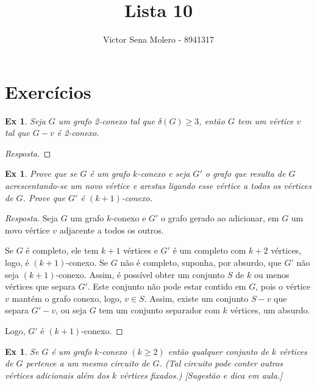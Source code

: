 \documentclass[12pt]{article}
\newcounter{exCounter}
\newtheorem{ex}[exCounter]{Ex}
\begin{document}
 
 
\title{Lista 10}
\author{Victor Sena Molero - 8941317}
\maketitle

\section{Exercícios}
\begin{ex}
Seja $G$ um grafo 2-conexo tal que $\delta(G) \geq 3$, então $G$ tem um vértice $v$ tal que $G-v$ é 2-conexo.
\end{ex}

\begin{proof}[Resposta]
\end{proof}

\begin{ex}
Prove que se $G$ é um grafo $k$-conexo e seja $G'$ o grafo que resulta de $G$ acrescentando-se um novo vértice e arestas ligando esse vértice a todos os vértices de $G$. Prove que $G'$ é $(k+1)$-conexo.
\end{ex}

\begin{proof}[Resposta]
Seja $G$ um grafo $k$-conexo e $G'$ o grafo gerado ao adicionar, em $G$ um novo vértice $v$ adjacente a todos os outros.

Se $G$ é completo, ele tem $k+1$ vértices e $G'$ é um completo com $k+2$ vértices, logo, é $(k+1)$-conexo. Se $G$ não é completo, suponha, por absurdo, que $G'$ não seja $(k+1)$-conexo. Assim, é possível obter um conjunto $S$ de $k$ ou menos vértices que separa $G'$. Este conjunto não pode estar contido em $G$, pois o vértice $v$ mantém o grafo conexo, logo, $v \in S$. Assim, existe um conjunto $S-v$ que separa $G'-v$, ou seja $G$ tem um conjunto separador com $k$ vértices, um absurdo.

Logo, $G'$ é $(k+1)$-conexo.
\end{proof}

\begin{ex}
Se $G$ é um grafo $k$-conexo $(k \geq 2)$ então qualquer conjunto de $k$ vértices de $G$ pertence a um mesmo circuito de $G$. (Tal circuito pode conter outros vértices adicionais além dos $k$ vértices fixados.) [Sugestão e dica em aula.]
\end{ex}
\end{document}
